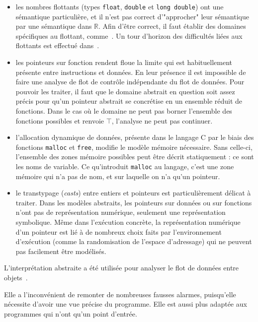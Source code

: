 \begin{itemize}
\item les nombres flottants
(types \texttt{float}, \texttt{double} et \texttt{long double}) ont une
sémantique particulière, et il n'est pas correct d'"approcher" leur sémantique
par une sémantique dans $ℝ$. Afin d'être correct, il faut établir des domaines
spécifiques au flottant, comme~\cite{floatpoly}. Un tour d'horizon des
difficultés liées aux flottants est effectué dans~\cite{floatpitfalls}.

\item les pointeurs sur fonction
rendent floue la limite qui est habituellement présente entre instructions et
données. En leur présence il est impossible de faire une analyse de flot de
contrôle indépendante du flot de données. Pour pouvoir les traiter, il faut que
le domaine abstrait en question soit assez précis pour qu'un pointeur abstrait
se concrétise en un ensemble réduit de fonctions. Dans le cas où le domaine ne
peut pas borner l'ensemble des fonctions possibles et renvoie $\top$, l'analyse
ne peut pas continuer.

\item l'allocation dynamique
de données, présente dans le langage C par le biais des fonctions
\texttt{malloc} et \texttt{free}, modifie le modèle mémoire
nécessaire. Sans celle-ci, l'ensemble des zones mémoire possibles peut être
décrit statiquement : ce sont les noms de variable. Ce qu'introduit
\texttt{malloc} au langage, c'est une zone mémoire qui n'a pas de nom, et sur
laquelle on n'a qu'un pointeur.


\item le transtypage (\emph{casts}) entre entiers et pointeurs
est particulièrement délicat à traiter. Dans les modèles abstraits, les
pointeurs sur données ou sur fonctions n'ont pas de représentation numérique,
seulement une représentation symbolique. Même dans l'exécution concrète, la
représentation numérique d'un pointeur est lié à de nombreux choix faits par
l'environnement d'exécution (comme la randomisation de l'espace d'adressage) qui
ne peuvent pas facilement être modélisés.

\end{itemize}

L'interprétation abstraite a été utilisée pour analyser le flot de données entre
objets~\cite{liang2012taint}.

Elle a l'inconvénient de remonter de nombreuses fausses alarmes, puisqu'elle
nécessite d'avoir une vue précise du programme. Elle est aussi plus adaptée aux
programmes qui n'ont qu'un point d'entrée.

